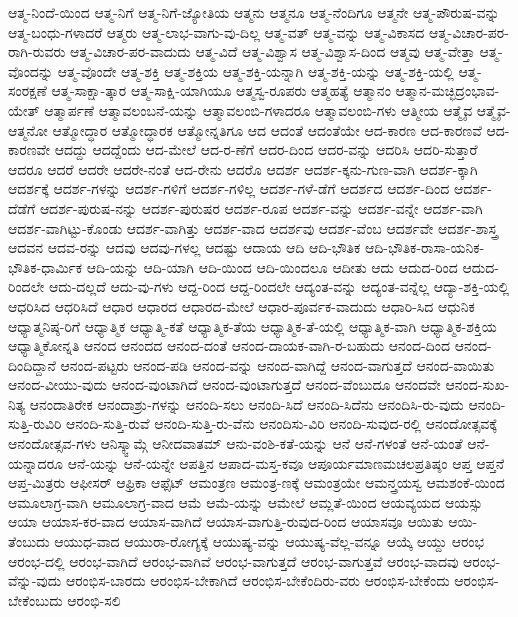 {ಆತ್ಮ-ನಿಂದೆ-ಯಿಂದ
ಆತ್ಮ-ನಿಗೆ
ಆತ್ಮ-ನಿಗೆ-ಜ್ಯೋತಿಯ
ಆತ್ಮನು
ಆತ್ಮನೂ
ಆತ್ಮ-ನೆಂದಿಗೂ
ಆತ್ಮನೇ
ಆತ್ಮ-ಪೌರುಷ-ವನ್ನು
ಆತ್ಮ-ಬಂಧು-ಗಳಾದರೆ
ಆತ್ಮರು
ಆತ್ಮ-ಲಾಭ-ವಾಗು-ವು-ದಿಲ್ಲ
ಆತ್ಮ-ವತ್
ಆತ್ಮ-ವನ್ನು
ಆತ್ಮ-ವಿಕಾಸದ
ಆತ್ಮ-ವಿಚಾರ-ಪರ-ರಾಗಿ-ರುವರು
ಆತ್ಮ-ವಿಚಾರ-ಪರ-ವಾದುದು
ಆತ್ಮ-ವಿದೆ
ಆತ್ಮ-ವಿಶ್ವಾಸ
ಆತ್ಮ-ವಿಶ್ವಾಸ-ದಿಂದ
ಆತ್ಮವು
ಆತ್ಮ-ವೇತ್ತಾ
ಆತ್ಮ-ವೊಂದನ್ನು
ಆತ್ಮ-ವೊಂದೇ
ಆತ್ಮ-ಶಕ್ತಿ
ಆತ್ಮ-ಶಕ್ತಿಯ
ಆತ್ಮ-ಶಕ್ತಿ-ಯನ್ನಾಗಿ
ಆತ್ಮ-ಶಕ್ತಿ-ಯನ್ನು
ಆತ್ಮ-ಶಕ್ತಿ-ಯಲ್ಲಿ
ಆತ್ಮ-ಸಂರಕ್ಷಣೆ
ಆತ್ಮ-ಸಾಕ್ಷಾ-ತ್ಕಾರ
ಆತ್ಮ-ಸಾಕ್ಷಿ-ಯಾಗಿಯೂ
ಆತ್ಮಸ್ವ-ರೂಪರು
ಆತ್ಮಹತ್ಯೆ
ಆತ್ಮಾನಂ
ಆತ್ಮಾನ-ಮಚ್ಛಿದ್ರಂಭಾವ-ಯೇತ್
ಆತ್ಮಾರ್ಪಣೆ
ಆತ್ಮಾವಲಂಬನೆ-ಯನ್ನು
ಆತ್ಮಾವಲಂಬಿ-ಗಳಾದರೂ
ಆತ್ಮಾವಲಂಬಿ-ಗಳು
ಆತ್ಮೀಯ
ಆತ್ಮೈವ
ಆತ್ಮೈವ-ಆತ್ಮನೋ
ಆತ್ಮೋದ್ಧಾರ
ಆತ್ಮೋದ್ಧಾರಕ
ಆತ್ಮೋನ್ನತಿಗೂ
ಆದ
ಆದಂತೆ
ಆದಂತೆಯೇ
ಆದ-ಕಾರಣ
ಆದ-ಕಾರಣವೆ
ಆದ-ಕಾರಣವೇ
ಆದದ್ದು
ಆದದ್ದೆಂದು
ಆದ-ಮೇಲೆ
ಆದ-ರ-ಣೆಗೆ
ಆದರ-ದಿಂದ
ಆದರ-ವನ್ನು
ಆದರಿಸಿ
ಆದರಿ-ಸುತ್ತಾರೆ
ಆದರೂ
ಆದರೆ
ಆದರೇ
ಆದರೇ-ನಂತೆ
ಆದ-ರೇನು
ಆದರೊ
ಆದರ್ಶ
ಆದರ್ಶ-ಕ್ಕನು-ಗುಣ-ವಾಗಿ
ಆದರ್ಶ-ಕ್ಕಾಗಿ
ಆದರ್ಶಕ್ಕೆ
ಆದರ್ಶ-ಗಳನ್ನು
ಆದರ್ಶ-ಗಳಿಗೆ
ಆದರ್ಶ-ಗಳಿಲ್ಲ
ಆದರ್ಶ-ಗಳೆ-ಡೆಗೆ
ಆದರ್ಶದ
ಆದರ್ಶ-ದಿಂದ
ಆದರ್ಶ-ದೆಡೆಗೆ
ಆದರ್ಶ-ಪುರುಷ-ನನ್ನು
ಆದರ್ಶ-ಪುರುಷರ
ಆದರ್ಶ-ರೂಪ
ಆದರ್ಶ-ವನ್ನು
ಆದರ್ಶ-ವನ್ನೇ
ಆದರ್ಶ-ವಾಗಿ
ಆದರ್ಶ-ವಾಗಿಟ್ಟು-ಕೊಂಡು
ಆದರ್ಶ-ವಾಗಿತ್ತು
ಆದರ್ಶ-ವಾದ
ಆದರ್ಶವು
ಆದರ್ಶ-ವೆಂಬ
ಆದರ್ಶವೇ
ಆದರ್ಶ-ಶಾಸ್ತ್ರ
ಆದವನ
ಆದವ-ರನ್ನು
ಆದವು
ಆದವು-ಗಳಲ್ಲ
ಆದಷ್ಟು
ಆದಾಯ
ಆದಿ
ಆದಿ-ಭೌತಿಕ
ಆದಿ-ಭೌತಿಕ-ರಾಸಾ-ಯನಿಕ-ಭೌತಿಕ-ಧಾರ್ಮಿಕ
ಆದಿ-ಯನ್ನು
ಆದಿ-ಯಾಗಿ
ಆದಿ-ಯಿಂದ
ಆದಿ-ಯಿಂದಲೂ
ಆದೀತು
ಆದು
ಆದುದ-ರಿಂದ
ಆದುದ-ರಿಂದಲೇ
ಆದು-ದಲ್ಲದೆ
ಆದು-ವು-ಗಳು
ಆದ್ದ-ರಿಂದ
ಆದ್ದ-ರಿಂದಲೇ
ಆದ್ಯಂತ-ವನ್ನು
ಆದ್ಯಂತ-ವನ್ನೆಲ್ಲ
ಆದ್ಯಾ-ಶಕ್ತಿ-ಯಲ್ಲಿ
ಆಧರಿಸಿದ
ಆಧರಿಸಿದೆ
ಆಧಾರ
ಆಧಾರದ
ಆಧಾರದ-ಮೇಲೆ
ಆಧಾರ-ಪೂರ್ವಕ-ವಾದುದು
ಆಧಾರಿ-ಸಿದ
ಆಧುನಿಕ
ಆಧ್ಯಾತ್ಮನಿಷ್ಠ-ರಿಗೆ
ಆಧ್ಯಾತ್ಮಿಕ
ಆಧ್ಯಾತ್ಮಿ-ಕತೆ
ಆಧ್ಯಾತ್ಮಿಕ-ತೆಯ
ಆಧ್ಯಾತ್ಮಿಕ-ತೆ-ಯಲ್ಲಿ
ಆಧ್ಯಾತ್ಮಿಕ-ವಾಗಿ
ಆಧ್ಯಾತ್ಮಿಕ-ಶಕ್ತಿಯ
ಆಧ್ಯಾತ್ಮಿಕೋನ್ನತಿ
ಆನಂದ
ಆನಂದದ
ಆನಂದ-ದಂತೆ
ಆನಂದ-ದಾಯಕ-ವಾಗಿ-ರ-ಬಹುದು
ಆನಂದ-ದಿಂದ
ಆನಂದ-ದಿಂದಿದ್ದಾನೆ
ಆನಂದ-ಪಟ್ಟರು
ಆನಂದ-ಪಡಿ
ಆನಂದ-ವನ್ನು
ಆನಂದ-ವಾಗಿದ್ದೆ
ಆನಂದ-ವಾಗುತ್ತದೆ
ಆನಂದ-ವಾಯಿತು
ಆನಂದ-ವೀಯು-ವುದು
ಆನಂದ-ವುಂಟಾಗಿದೆ
ಆನಂದ-ವುಂಟಾಗುತ್ತದೆ
ಆನಂದ-ವೆಂಬುದೂ
ಆನಂದವೇ
ಆನಂದ-ಸುಖ-ನಿತ್ಯ
ಆನಂದಾತಿರೇಕ
ಆನಂದಾಶ್ರು-ಗಳನ್ನು
ಆನಂದಿ-ಸಲು
ಆನಂದಿ-ಸಿದೆ
ಆನಂದಿ-ಸಿದೆನು
ಆನಂದಿಸಿ-ರು-ವುದು
ಆನಂದಿ-ಸುತ್ತಿ-ರುವಿರಿ
ಆನಂದಿ-ಸುತ್ತಿ-ರುವೆ
ಆನಂದಿ-ಸುತ್ತಿ-ರು-ವೆನು
ಆನಂದಿಸು-ವಿರಿ
ಆನಂದಿ-ಸುವುದ-ರಲ್ಲಿ
ಆನಂದೋತ್ಸವಕ್ಕೆ
ಆನಂದೋತ್ಸವ-ಗಳು
ಆನಿಸ್ಕ್ವಾಮ್ಗೆ
ಆನೀದವಾತಮ್
ಆನು-ವಂಶಿ-ಕತೆ-ಯನ್ನು
ಆನೆ
ಆನೆ-ಗಳಂತೆ
ಆನೆ-ಯಂತೆ
ಆನೆ-ಯನ್ನಾದರೂ
ಆನೆ-ಯನ್ನು
ಆನೆ-ಯನ್ನೇ
ಆಪತ್ತಿನ
ಆಪಾದ-ಮಸ್ತ-ಕವೂ
ಆಪೂರ್ಯಮಾಣಮಚಲಪ್ರತಿಷ್ಠಂ
ಆಪ್ತ
ಆಪ್ತನೆ
ಆಪ್ತ-ಮಿತ್ರರು
ಆಫೀಸರ್
ಆಫ್ರಿಕಾ
ಆಫ್ಸೆಟ್
ಆಮಂತ್ರಣ
ಆಮಂತ್ರ-ಣಕ್ಕೆ
ಆಮಂತ್ರಯೇ
ಆಮನ್ತ್ರಯಸ್ವ
ಆಮಶಂಕೆ-ಯಿಂದ
ಆಮೂಲಾಗ್ರ-ವಾಗಿ
ಆಮೂಲಾಗ್ರ-ವಾದ
ಆಮೆ
ಆಮೆ-ಯನ್ನು
ಆಮೇಲೆ
ಆಮ್ಲತೆ-ಯಿಂದ
ಆಯವ್ಯಯದ
ಆಯಸ್ಸು
ಆಯಾ
ಆಯಾಸ-ಕರ-ವಾದ
ಆಯಾಸ-ವಾಗಿದೆ
ಆಯಾಸ-ವಾಗುತ್ತಿ-ರುವುದ-ರಿಂದ
ಆಯಾಸವೂ
ಆಯಿತು
ಆಯಿ-ತೆಂಬುದು
ಆಯುಧ-ವಾದ
ಆಯುರಾ-ರೋಗ್ಯಕ್ಕೆ
ಆಯುಷ್ಯ-ವನ್ನು
ಆಯುಷ್ಯ-ವೆಲ್ಲ-ವನ್ನೂ
ಆಯ್ಕೆ
ಆಯ್ದು
ಆರಂಭ
ಆರಂಭ-ದಲ್ಲಿ
ಆರಂಭ-ವಾಗಿದೆ
ಆರಂಭ-ವಾಗಿವೆ
ಆರಂಭ-ವಾಗುತ್ತದೆ
ಆರಂಭ-ವಾಗುತ್ತವೆ
ಆರಂಭ-ವಾದವು
ಆರಂಭ-ವೆನ್ನು-ವುದು
ಆರಂಭಿಸ-ಬಾರದು
ಆರಂಭಿಸ-ಬೇಕಾಗಿದೆ
ಆರಂಭಿಸ-ಬೇಕೆಂದಿರು-ವರು
ಆರಂಭಿಸ-ಬೇಕೆಂದು
ಆರಂಭಿಸ-ಬೇಕೆಂಬುದು
ಆರಂಭಿ-ಸಲಿ
}
